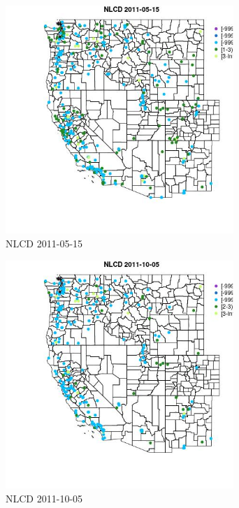\begin{figure} 
\centering  
\includegraphics[width=0.77\textwidth]{Code_Outputs/ML_input_report_ML_input_PM25_Step5_part_d_de_duplicated_aves_ML_input_MapObsNLCD2011-05-15.jpg} 
\caption{\label{fig:ML_input_report_ML_input_PM25_Step5_part_d_de_duplicated_aves_ML_inputMapObsNLCD2011-05-15}NLCD 2011-05-15} 
\end{figure} 
 

\clearpage 

\begin{figure} 
\centering  
\includegraphics[width=0.77\textwidth]{Code_Outputs/ML_input_report_ML_input_PM25_Step5_part_d_de_duplicated_aves_ML_input_MapObsNLCD2011-10-05.jpg} 
\caption{\label{fig:ML_input_report_ML_input_PM25_Step5_part_d_de_duplicated_aves_ML_inputMapObsNLCD2011-10-05}NLCD 2011-10-05} 
\end{figure} 
 
